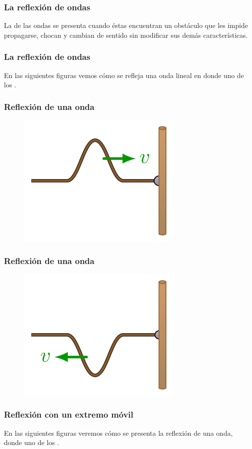 \documentclass[14pt]{beamer}
\begin{document}
\begin{frame}
\frametitle{La reflexión de ondas}
La  de las ondas se presenta cuando éstas encuentran un obstáculo que les impide propagarse, \pause chocan y cambian de sentido sin modificar sus demás características.
\end{frame}
\begin{frame}
\frametitle{La reflexión de ondas}
En las siguientes figuras vemos cómo se refleja una onda lineal en donde uno de los .
\end{frame}
\begin{frame}
\frametitle{Reflexión de una onda}
\begin{figure}
    \centering
    \includegraphics[scale=0.7]{Imagenes/Reflexion_Ondas_01.png}
\end{figure}
\end{frame}
\begin{frame}
\frametitle{Reflexión de una onda}
\begin{figure}
    \centering
    \includegraphics[scale=0.7]{Imagenes/Reflexion_Ondas_02.png}
\end{figure}
\end{frame}
\begin{frame}
\frametitle{Reflexión con un extremo móvil}
En las siguientes figuras veremos cómo se presenta la reflexión de una onda, donde uno de los .
\end{frame}
\end{document}
